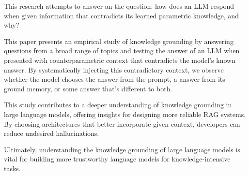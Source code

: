 This research attempts to answer an the question: how does an LLM respond when given information that contradicts its learned parametric knowledge, and why?


This paper presents an empirical study of knowledge grounding by answering questions from a broad range of topics and testing the answer of an LLM when presented with counterparametric context that contradicts the model's known answer.
By systematically injecting this contradictory context, we observe whether the model chooses the \Contextual{} answer from the prompt, a \Parametric{} answer from its ground memory, or some \Other{} answer that's different to both.


This study contributes to a deeper understanding of knowledge grounding in large language models, offering insights for designing more reliable RAG systems.
By choosing architectures that better incorporate given context, developers can reduce undesired hallucinations.

Ultimately, understanding the knowledge grounding of large language models is vital for building more trustworthy language models for knowledge-intensive tasks.

